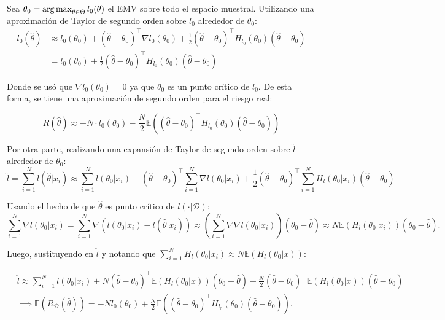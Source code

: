 Sea $\theta_0 = \operatorname*{arg\,max}_{\theta\in\Theta} l_0(\theta)$ el EMV sobre todo el espacio muestral. Utilizando una aproximación de Taylor de segundo orden sobre $l_0$ alrededor de $\theta_0$:
\begin{align}
	l_0(\hat{\theta})&\approx l_0(\theta_0) + (\hat{\theta}-\theta_0)^\top \nabla l_0(\theta_0) + \frac{1}{2}(\hat{\theta}-\theta_0)^\top H_{l_0}(\theta_0) (\hat{\theta}-\theta_0)\\
	&= l_0(\theta_0) + \frac{1}{2}(\hat{\theta}-\theta_0)^\top H_{l_0}(\theta_0) (\hat{\theta}-\theta_0)
\end{align}

Donde se usó que $\nabla l_0(\theta_0)=0$ ya que $\theta_0$ es un punto crítico de $l_0$. De esta forma, se tiene una aproximación de segundo orden para el riesgo real:

\begin{equation*}
	R(\hat{\theta}) \approx -N \cdot l_0(\theta_0) - \frac{N}{2}\mathbb{E}\left((\hat{\theta}-\theta_0)^\top H_{l_0}(\theta_0) (\hat{\theta}-\theta_0)\right)
\end{equation*}

Por otra parte, realizando una expansión de Taylor de segundo orden sobre $\hat{l}$ alrededor de $\theta_0$:
\begin{equation}
	\hat{l} = \sum_{i=1}^N l(\hat{\theta}|x_i) \approx \sum_{i=1}^N l(\theta_0|x_i) + (\hat{\theta}-\theta_0)^\top \sum_{i=1}^N \nabla l(\theta_0|x_i) + \frac{1}{2}(\hat{\theta}-\theta_0)^\top \sum_{i=1}^N H_l(\theta_0|x_i) (\hat{\theta}-\theta_0)
\end{equation}

Usando el hecho de que $\hat{\theta}$ es punto crítico de $l(\cdot|\mathcal{D})$:
\begin{equation}
	\sum_{i=1}^N \nabla l(\theta_0|x_i) = \sum_{i=1}^N \nabla \left(l(\theta_0|x_i) - l(\hat{\theta}|x_i)\right) \approx \left(\sum_{i=1}^N \nabla\nabla l(\theta_0|x_i)\right) (\theta_0-\hat{\theta}) \approx N \mathbb{E}(H_l(\theta_0|x_i)) (\theta_0-\hat{\theta}).
\end{equation}

Luego, sustituyendo en $\hat{l}$ y notando que $\sum\limits_{i=1}^N H_l(\theta_0|x_i) \approx N\mathbb{E}(H_l(\theta_0|x))$:

\begin{align}
	&\hat{l} \approx \sum_{i=1}^N l(\theta_0|x_i) + N(\hat{\theta}-\theta_0)^\top \mathbb{E}(H_l(\theta_0|x)) (\theta_0-\hat{\theta}) + \frac{N}{2}(\hat{\theta}-\theta_0)^\top \mathbb{E}(H_l(\theta_0|x)) (\hat{\theta}-\theta_0)\\
	&\implies \mathbb{E}(R_\mathcal{D}(\hat{\theta})) = -Nl_0(\theta_0) + \frac{N}{2} \mathbb{E}\left((\hat{\theta}-\theta_0)^\top H_{l_0}(\theta_0) (\hat{\theta}-\theta_0)\right).
\end{align}

